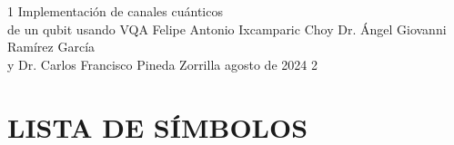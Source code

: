 \documentclass[letterpaper,12pt]{thesisECFM}
\theoremstyle{plain}
\theoremstyle{definition}
\theoremstyle{definition}
\theoremstyle{remark}
\newcommand{\1}{\mathbb{1}}
\begin{document}
\datosThesis%
{1}%
{Implementación de canales cuánticos \\ de un qubit usando VQA}%
{Felipe Antonio Ixcamparic Choy}%
{Dr. Ángel Giovanni Ramírez García\\y Dr. Carlos Francisco Pineda Zorrilla}%
{agosto de 2024}		%
{2}							%

\frontmatter
\tableofcontents    %
\chapter*{LISTA DE SÍMBOLOS}
{}
\end{document}
